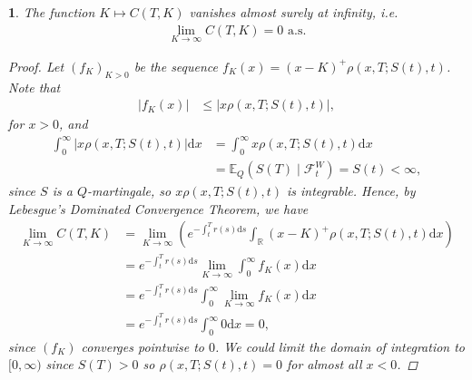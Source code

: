 \documentclass[english]{article}
\numberwithin{equation}{section}
\numberwithin{figure}{section}
\theoremstyle{bolddescit}
\newtheorem{theorem}{\protect\theoremname}[section]
\theoremstyle{definition}
\theoremstyle{definition}
\theoremstyle{plain}
\theoremstyle{plain}
\theoremstyle{bolddesc}
\theoremstyle{plain}
\theoremstyle{remark}
\providecommand{\theoremname}{Theorem}
\begin{document}
\begin{theorem}\label{thm:dupire-asymptotic}
  The function $K \mapsto C(T,K)$ vanishes almost surely at infinity, i.e.
  \begin{align*}
    \lim_{K \to \infty} C(T,K) = 0 \text{ a.s.}
  \end{align*}

  \begin{proof}
    Let $(f_K)_{K > 0}$ be the sequence $f_K(x) = (x-K)^+ \rho(x,T;S(t),t)$. Note that
    \begin{align*}
      |f_K(x)|
      &\le |x \rho(x,T;S(t),t)|,
    \end{align*}
    for $x > 0$, and
    \begin{align*}
      \int_0^\infty |x\rho(x,T;S(t),t)| \mathrm{d}x
      &= \int_0^\infty x\rho(x,T;S(t),t) \mathrm{d}x \tag{positive integrand}\\
      &= \mathbb{E}_Q(S(T) \mid \mathcal{F}^W_t)
      = S(t) < \infty,
    \end{align*}
    since $S$ is a $Q$-martingale, so $x \rho(x,T;S(t),t)$ is integrable. Hence, by Lebesgue's Dominated Convergence Theorem, we have
    \begin{align*}
      \lim_{K \to \infty} C(T,K)
      &= \lim_{K \to \infty} \left(e^{-\int_t^T r(s) \mathrm{d}s} \int_\mathbb{R} (x-K)^+ \rho(x,T;S(t),t) \mathrm{d}x\right) \\
      &= e^{-\int_t^T r(s) \mathrm{d}s} \lim_{K \to \infty} \int_0^\infty f_K(x) \mathrm{d}x\\
      &= e^{-\int_t^T r(s) \mathrm{d}s} \int_0^\infty \lim_{K \to \infty} f_K(x) \mathrm{d}x\\
      &= e^{-\int_t^T r(s) \mathrm{d}s} \int_0^\infty 0 \mathrm{d}x = 0,
    \end{align*}
    since $(f_K)$ converges pointwise to $0$. We could limit the domain of integration to $[0,\infty)$ since $S(T) > 0$ so $\rho(x,T;S(t),t) = 0$ for almost all $x < 0$.
  \end{proof}
\end{theorem}
\end{document}
